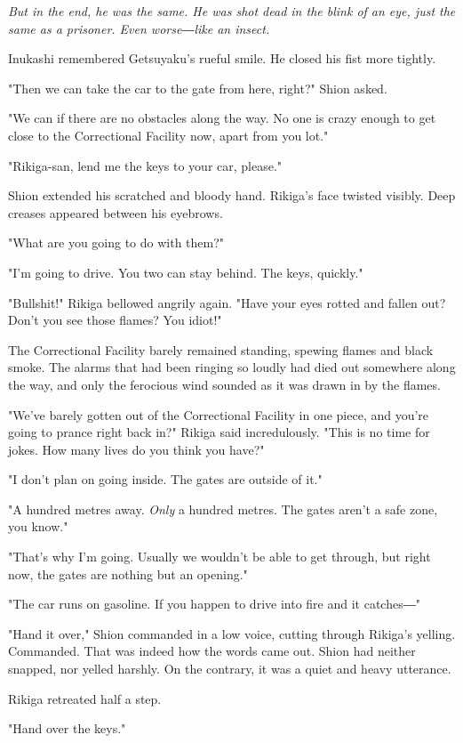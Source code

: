 \emph{But in the end, he was the same. He was shot dead in the blink of an
eye, just the same as a prisoner. Even worse―like an insect.}

Inukashi remembered Getsuyaku's rueful smile. He closed his fist more
tightly.

"Then we can take the car to the gate from here, right?" Shion asked.

"We can if there are no obstacles along the way. No one is crazy enough
to get close to the Correctional Facility now, apart from you lot."

"Rikiga-san, lend me the keys to your car, please."

Shion extended his scratched and bloody hand. Rikiga's face twisted
visibly. Deep creases appeared between his eyebrows.

"What are you going to do with them?"

"I'm going to drive. You two can stay behind. The keys, quickly."

"Bullshit!" Rikiga bellowed angrily again. "Have your eyes rotted and
fallen out? Don't you see those flames? You idiot!"

The Correctional Facility barely remained standing, spewing flames and
black smoke. The alarms that had been ringing so loudly had died out
somewhere along the way, and only the ferocious wind sounded as it was
drawn in by the flames.

"We've barely gotten out of the Correctional Facility in one piece, and
you're going to prance right back in?" Rikiga said incredulously. "This
is no time for jokes. How many lives do you think you have?"

"I don't plan on going inside. The gates are outside of it."

"A hundred metres away. \emph{Only} a hundred metres. The gates aren't a safe
zone, you know."

"That's why I'm going. Usually we wouldn't be able to get through, but
right now, the gates are nothing but an opening."

"The car runs on gasoline. If you happen to drive into fire and it
catches―"

"Hand it over," Shion commanded in a low voice, cutting through Rikiga's
yelling. Commanded. That was indeed how the words came out. Shion had
neither snapped, nor yelled harshly. On the contrary, it was a quiet and
heavy utterance.

Rikiga retreated half a step.

"Hand over the keys."

